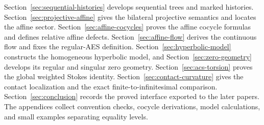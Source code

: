 Section~\ref{sec:sequential-histories} develops sequential trees and marked histories.
Section~\ref{sec:projective-affine} gives the bilateral projective semantics and
locates the affine sector.  Section~\ref{sec:affine-cocycles} proves the affine
cocycle formulas and defines relative affine defects.  Section~\ref{sec:affine-flow}
derives the continuous flow and fixes the regular-AES definition.
Section~\ref{sec:hyperbolic-model} constructs the homogeneous hyperbolic model, and
Section~\ref{sec:zero-geometry} develops its regular and singular zero geometry.
Section~\ref{sec:acs-torsion} proves the global weighted Stokes identity.
Section~\ref{sec:contact-curvature} gives the contact localization and the exact
finite-to-infinitesimal comparison.  Section~\ref{sec:conclusion} records the proved
interface exported to the later papers.  The appendices collect convention checks,
cocycle derivations, model calculations, and small examples separating equality
levels.
